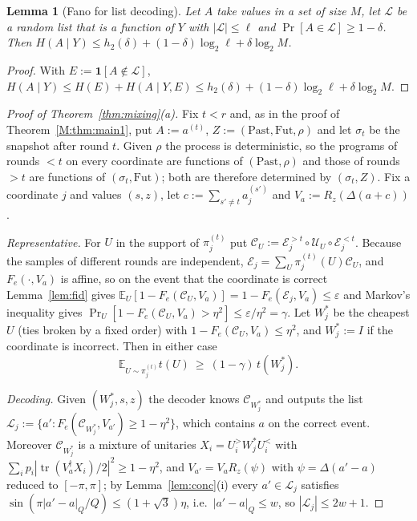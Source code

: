 \documentclass[aps,prx,twocolumn,superscriptaddress,nofootinbib,longbibliography]{revtex4-2}
\theoremstyle{plain}
\newtheorem{lemma}{Lemma}
\theoremstyle{definition}
\theoremstyle{remark}
\newcommand{\E}{\mathbb{E}}
\newcommand{\tr}{\operatorname{tr}}
\begin{document}
\begin{lemma}[Fano for list decoding]\label{lem:fanolist}
Let $A$ take values in a set of size $M$, let $\mathcal L$ be a random list that is a function of $Y$ with $|\mathcal L|\le\ell$ and $\Pr[A\in\mathcal L]\ge1-\delta$. Then $H(A\mid Y)\le h_2(\delta)+(1-\delta)\log_2\ell+\delta\log_2M$.
\end{lemma}
\begin{proof}
With $E:=\mathbf1[A\notin\mathcal L]$, $H(A\mid Y)\le H(E)+H(A\mid Y,E)\le h_2(\delta)+(1-\delta)\log_2\ell+\delta\log_2M$.
\end{proof}

\begin{proof}[Proof of Theorem~\ref{thm:mixing}(a)]
Fix $t<r$ and, as in the proof of Theorem~\ref{M:thm:main1}, put $A:=a^{(t)}$, $Z:=(\mathrm{Past},\mathrm{Fut},\rho)$ and let $\sigma_t$ be the snapshot after round $t$. Given $\rho$ the process is deterministic, so the programs of rounds $<t$ on every coordinate are functions of $(\mathrm{Past},\rho)$ and those of rounds $>t$ are functions of $(\sigma_t,\mathrm{Fut})$; both are therefore determined by $(\sigma_t,Z)$. Fix a coordinate $j$ and values $(s,z)$, let $c:=\sum_{s'\ne t}a^{(s')}_j$ and $V_a:=R_z(\Delta(a+c))$.

\emph{Representative.} For $U$ in the support of $\pi^{(t)}_j$ put $\mathcal C_U:=\mathcal E^{>t}_j\circ\mathcal U_U\circ\mathcal E^{<t}_j$. Because the samples of different rounds are independent, $\mathcal E_j=\sum_U\pi^{(t)}_j(U)\mathcal C_U$, and $F_e(\cdot,V_a)$ is affine, so on the event that the coordinate is correct Lemma~\ref{lem:fid} gives $\E_U[1-F_e(\mathcal C_U,V_a)]=1-F_e(\mathcal E_j,V_a)\le\varepsilon$ and Markov's inequality gives $\Pr_U[1-F_e(\mathcal C_U,V_a)>\eta^2]\le\varepsilon/\eta^2=\gamma$. Let $W^*_j$ be the cheapest $U$ (ties broken by a fixed order) with $1-F_e(\mathcal C_U,V_a)\le\eta^2$, and $W^*_j:=I$ if the coordinate is incorrect. Then in either case
\begin{equation}\label{eq:rep}
\E_{U\sim\pi^{(t)}_j}t(U)\ \ge\ (1-\gamma)\,t(W^*_j).
\end{equation}

\emph{Decoding.} Given $(W^*_j,s,z)$ the decoder knows $\mathcal C_{W^*_j}$ and outputs the list $\mathcal L_j:=\{a':F_e(\mathcal C_{W^*_j},V_{a'})\ge1-\eta^2\}$, which contains $a$ on the correct event. Moreover $\mathcal C_{W^*_j}$ is a mixture of unitaries $X_i=U^>_iW^*_jU^<_i$ with $\sum_ip_i|\tr(V_a^\dagger X_i)/2|^2\ge1-\eta^2$, and $V_{a'}=V_aR_z(\psi)$ with $\psi=\Delta(a'-a)$ reduced to $[-\pi,\pi]$; by Lemma~\ref{lem:conc}(i) every $a'\in\mathcal L_j$ satisfies $\sin(\pi|a'-a|_Q/Q)\le(1+\sqrt3)\eta$, i.e.\ $|a'-a|_Q\le w$, so $|\mathcal L_j|\le2w+1$.


\end{proof}
\end{document}
